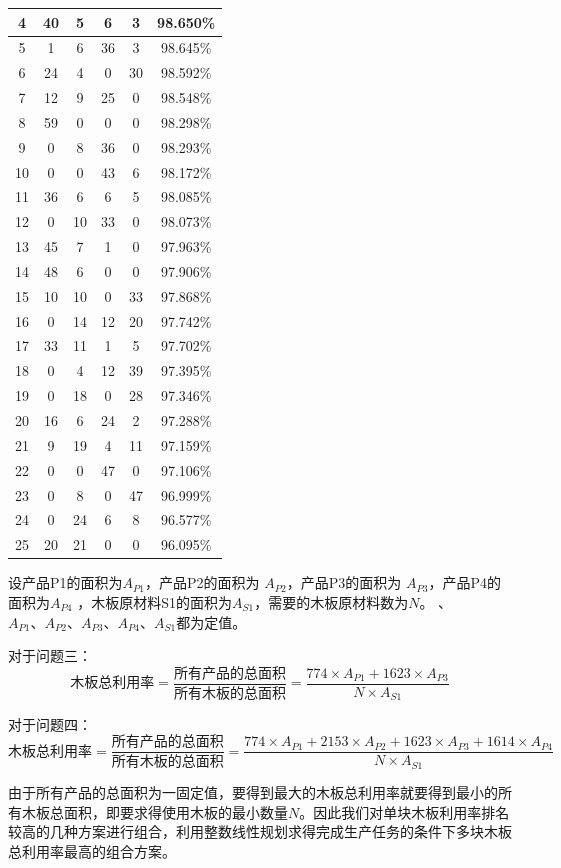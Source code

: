 \documentclass[hyperref,UTF8]{article}
\begin{document}
{\begin{table}[htbp]
\begin{tabular}{|c|c|c|c|c|c|}
    \hline
    4 & 40 & 5 & 6 & 3 & 98.650\% \\
    \hline
    5 & 1 & 6 & 36 & 3 & 98.645\% \\
    \hline
    6 & 24 & 4 & 0 & 30 & 98.592\% \\
    \hline
    7 & 12 & 9 & 25 & 0 & 98.548\% \\
    \hline
    8 & 59 & 0 & 0 & 0 & 98.298\% \\
    \hline
    9 & 0 & 8 & 36 & 0 & 98.293\% \\
    \hline
    10 & 0 & 0 & 43 & 6 & 98.172\% \\
    \hline
    11 & 36 & 6 & 6 & 5 & 98.085\% \\
    \hline
    12 & 0 & 10 & 33 & 0 & 98.073\% \\
    \hline
    13 & 45 & 7 & 1 & 0 & 97.963\% \\
    \hline
    14 & 48 & 6 & 0 & 0 & 97.906\% \\
    \hline
    15 & 10 & 10 & 0 & 33 & 97.868\% \\
    \hline
    16 & 0 & 14 & 12 & 20 & 97.742\% \\
    \hline
    17 & 33 & 11 & 1 & 5 & 97.702\% \\
    \hline
    18 & 0 & 4 & 12 & 39 & 97.395\% \\
    \hline
    19 & 0 & 18 & 0 & 28 & 97.346\% \\
    \hline
    20 & 16 & 6 & 24 & 2 & 97.288\% \\
    \hline
    21 & 9 & 19 & 4 & 11 & 97.159\% \\
    \hline
    22 & 0 & 0 & 47 & 0 & 97.106\% \\
    \hline
    23 & 0 & 8 & 0 & 47 & 96.999\% \\
    \hline
    24 & 0 & 24 & 6 & 8 & 96.577\% \\
    \hline
    25 & 20 & 21 & 0 & 0 & 96.095\% \\
    \hline
    \end{tabular}%
  \label{tab:haoliyong}%
\end{table}%
设产品P1的面积为$A_{P1}$，产品P2的面积为 $A_{P2}$，产品P3的面积为 $A_{P3}$，产品P4的面积为$A_{P4}$ ，木板原材料S1的面积为$A_{S1}$，需要的木板原材料数为$N$。 、 $A_{P1}\mbox{、}A_{P2}\mbox{、}A_{P3}\mbox{、}A_{P4}\mbox{、}A_{S1}$都为定值。\par
对于问题三：
$$\mbox{木板总利用率}=\frac{\mbox{所有产品的总面积}}{\mbox{所有木板的总面积}}=\frac{774\times A_{P1}+1623\times A_{P3}}{N\times A_{S1}}$$\par
对于问题四：
$$\mbox{木板总利用率}=\frac{\mbox{所有产品的总面积}}{\mbox{所有木板的总面积}}=\frac{774\times A_{P1}+2153\times A_{P2}+1623\times A_{P3}+1614\times A_{P4}}{N\times A_{S1}}$$\par
由于所有产品的总面积为一固定值，要得到最大的木板总利用率就要得到最小的所有木板总面积，即要求得使用木板的最小数量$N$。因此我们对单块木板利用率排名较高的几种方案进行组合，利用整数线性规划求得完成生产任务的条件下多块木板总利用率最高的组合方案。
}
\end{document}
